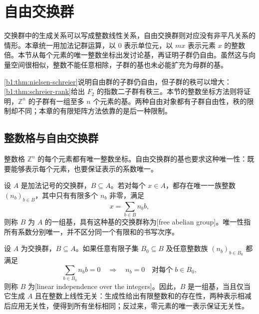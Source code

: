 
\section{自由交换群}
\label{b1:sec:0901}

交换群中的生成关系可以写成整数线性关系，自由交换群则对应没有非平凡关系的情形。本章统一用加法记群运算，以 \(0\) 表示单位元，以 \(mx\) 表示元素 \(x\) 的整数倍。本节从每个元素的唯一整数坐标出发讨论基，再证明子群仍自由。虽然这与向量空间很相似，整数不能任意相除，子群的基也未必能扩充为母群的基。

\ProseParagraphBreak
\cref{b1:thm:nielsen-schreier}说明自由群的子群仍自由，但子群的秩可以增大：\cref{b1:thm:schreier-rank}给出 \(F_2\) 的指数二子群有秩三。本节的整数坐标方法则将证明，\(\mathbb Z^n\) 的子群有一组至多 \(n\) 个元素的基。两种自由对象都有子群自由性，秩的限制却不同；本章的有限矩阵方法依靠的是后一种限制。

%
%

\subsection{整数格与自由交换群}
\label{b1:subsec:0901:01}

整数格 \(\mathbb Z^n\) 的每个元素都有唯一整数坐标。自由交换群的基也要求这种唯一性：既要能够表示每个元素，也要保证表示的系数唯一。

\begin{definition}\label{b1:def:free-abelian}
	设 \(A\) 是加法记号的交换群，\(B\subseteq A\)。若对每个 \(x\in A\)，都存在唯一一族整数 \((n_b)_{b\in B}\)，其中只有有限多个 \(n_b\) 非零，满足
	\[
		x=\sum_{b\in B}n_b b,
	\]
	则称 \(B\) 为 \(A\) 的一组基，具有这种基的交换群称为[free abelian group]。唯一性指所有系数分别唯一，并不区分同一个有限和的书写次序。
\end{definition}

设 \(A\) 为交换群，\(B\subseteq A\)。如果任意有限子集 \(B_0\subseteq B\) 及任意整数族 \((n_b)_{b\in B_0}\) 都满足
\[
	\sum_{b\in B_0}n_b b=0 \quad\Longrightarrow\quad n_b=0\quad\text{对每个}\;b\in B_0,
\]
则称 \(B\) 为[linear independence over the integers]。因此，\(B\) 是一组基，当且仅当它生成 \(A\) 且在整数上线性无关：生成性给出有限整数和的存在性，两种表示相减后应用无关性，便得到所有坐标相同；反过来，零元素的唯一表示保证无关性。

